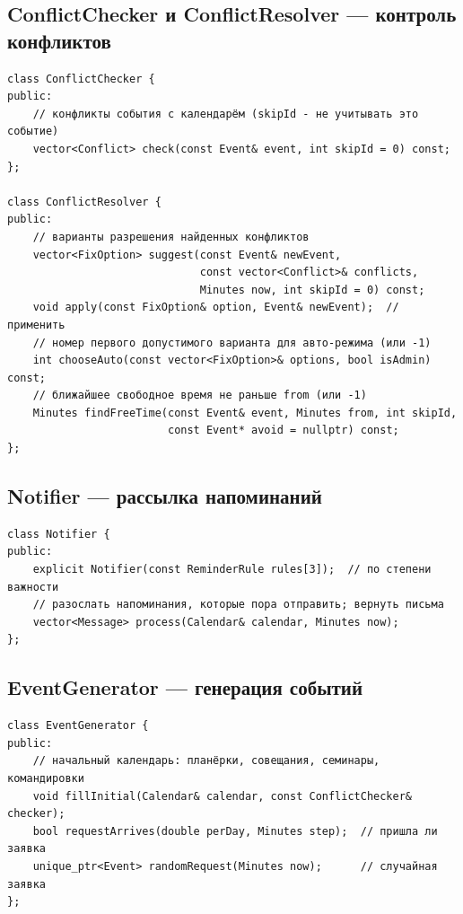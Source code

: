 \documentclass[12pt,a4paper]{article}
\begin{document}
\subsection*{ConflictChecker и ConflictResolver --- контроль конфликтов}
\begin{Verbatim}
class ConflictChecker {
public:
    // конфликты события с календарём (skipId - не учитывать это событие)
    vector<Conflict> check(const Event& event, int skipId = 0) const;
};

class ConflictResolver {
public:
    // варианты разрешения найденных конфликтов
    vector<FixOption> suggest(const Event& newEvent,
                              const vector<Conflict>& conflicts,
                              Minutes now, int skipId = 0) const;
    void apply(const FixOption& option, Event& newEvent);  // применить
    // номер первого допустимого варианта для авто-режима (или -1)
    int chooseAuto(const vector<FixOption>& options, bool isAdmin) const;
    // ближайшее свободное время не раньше from (или -1)
    Minutes findFreeTime(const Event& event, Minutes from, int skipId,
                         const Event* avoid = nullptr) const;
};
\end{Verbatim}

\subsection*{Notifier --- рассылка напоминаний}
\begin{Verbatim}
class Notifier {
public:
    explicit Notifier(const ReminderRule rules[3]);  // по степени важности
    // разослать напоминания, которые пора отправить; вернуть письма
    vector<Message> process(Calendar& calendar, Minutes now);
};
\end{Verbatim}

\subsection*{EventGenerator --- генерация событий}
\begin{Verbatim}
class EventGenerator {
public:
    // начальный календарь: планёрки, совещания, семинары, командировки
    void fillInitial(Calendar& calendar, const ConflictChecker& checker);
    bool requestArrives(double perDay, Minutes step);  // пришла ли заявка
    unique_ptr<Event> randomRequest(Minutes now);      // случайная заявка
};
\end{Verbatim}
\end{document}
